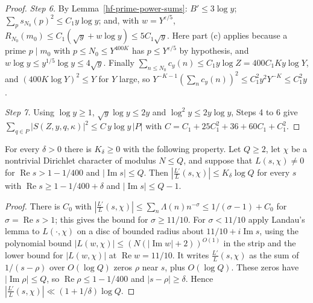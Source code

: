\begin{proof}
\emph{Step 6.} By Lemma~\ref{hf-prime-power-sums}: $B'\leq3\log y$;
$\sum_ps_{N_0}(p)^2\leq C_1y\log y$; and, with $w=Y^{\varepsilon/5}$,
$R_{N_0}(m_0)\leq C_1(\sqrt y+w\log y)\leq5C_1\sqrt y$. Here part (c) applies because a prime
$p\mid m_0$ with $p\leq N_0\leq Y^{400K}$ has $p\leq Y^{\varepsilon/5}$ by hypothesis, and
$w\log y\leq y^{1/5}\log y\leq4\sqrt y$. Finally
$\sum_{n\leq N_0}c_y(n)\leq C_1y\log Z=400C_1Ky\log Y$, and $(400K\log Y)^2\leq Y$ for $Y$ large, so
$Y^{-K-1}(\sum_nc_y(n))^2\leq C_1^2y^2Y^{-K}\leq C_1^2y$.

\emph{Step 7.} Using $\log y\geq1$, $\sqrt y\log y\leq2y$ and $\log^2y\leq2y\log y$, Steps 4 to 6
give $\sum_{q\in P}|S(Z,y,q,\kappa)|^2\leq C\,y\log y\,|P|$ with
$C=C_1+25C_1^2+36+60C_1+C_1^2$.
\end{proof}

\begin{lemma}\label{hf-log-derivative-box}
For every $\delta>0$ there is $K_\delta\geq0$ with the following property. Let $Q\geq2$, let $\chi$
be a nontrivial Dirichlet character of modulus $N\leq Q$, and suppose that $L(s,\chi)\neq0$ for
$\operatorname{Re}s>1-1/400$ and $|\operatorname{Im}s|\leq Q$. Then
$\left|\frac{L'}{L}(s,\chi)\right|\leq K_\delta\log Q$ for every $s$ with
$\operatorname{Re}s\geq1-1/400+\delta$ and $|\operatorname{Im}s|\leq Q-1$.
\end{lemma}

\begin{proof}
There is $C_0$ with $\left|\frac{L'}{L}(s,\chi)\right|\leq\sum_n\Lambda(n)n^{-\sigma}\leq
1/(\sigma-1)+C_0$ for $\sigma=\operatorname{Re}s>1$; this gives the bound for $\sigma\geq11/10$. For
$\sigma<11/10$ apply Landau's lemma \cite[Section 6.1]{MV07} to $L(\cdot,\chi)$ on a disc of bounded
radius about $11/10+i\operatorname{Im}s$, using the polynomial bound
$|L(w,\chi)|\leq(N(|\operatorname{Im}w|+2))^{O(1)}$ in the strip and the lower bound for
$|L(w,\chi)|$ at $\operatorname{Re}w=11/10$. It writes $\frac{L'}{L}(s,\chi)$ as the sum of
$1/(s-\rho)$ over $O(\log Q)$ zeros $\rho$ near $s$, plus $O(\log Q)$. These zeros have
$|\operatorname{Im}\rho|\leq Q$, so $\operatorname{Re}\rho\leq1-1/400$ and $|s-\rho|\geq\delta$.
Hence $\left|\frac{L'}{L}(s,\chi)\right|\ll(1+1/\delta)\log Q$.
\end{proof}

